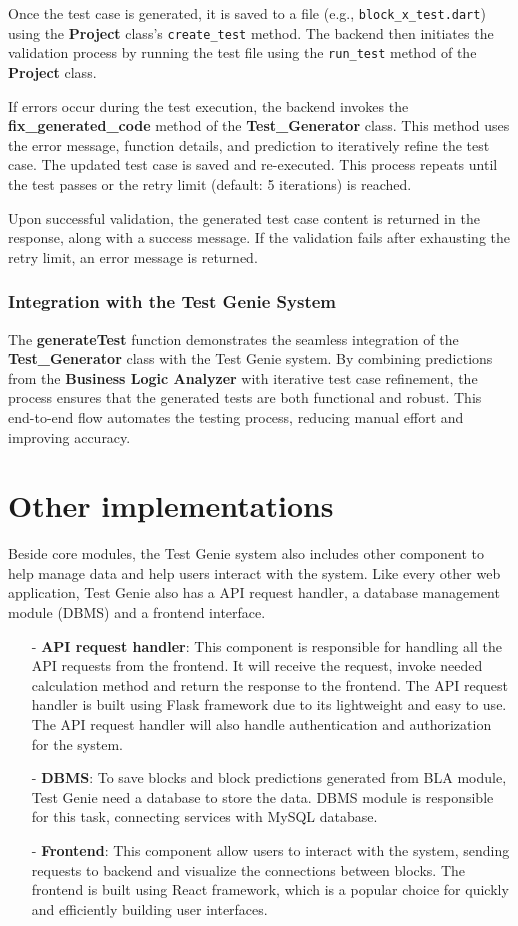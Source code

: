 Once the test case is generated, it is saved to a file (e.g., \texttt{block\_x\_test.dart}) using the \textbf{Project} class's \texttt{create\_test} method. The backend then initiates the validation process by running the test file using the \texttt{run\_test} method of the \textbf{Project} class.

If errors occur during the test execution, the backend invokes the \textbf{fix\_generated\_code} method of the \textbf{Test\_Generator} class. This method uses the error message, function details, and prediction to iteratively refine the test case. The updated test case is saved and re-executed. This process repeats until the test passes or the retry limit (default: 5 iterations) is reached.

Upon successful validation, the generated test case content is returned in the response, along with a success message. If the validation fails after exhausting the retry limit, an error message is returned.

\subsubsection{Integration with the Test Genie System}

The \textbf{generateTest} function demonstrates the seamless integration of the \textbf{Test\_Generator} class with the Test Genie system. By combining predictions from the \textbf{Business Logic Analyzer} with iterative test case refinement, the process ensures that the generated tests are both functional and robust. This end-to-end flow automates the testing process, reducing manual effort and improving accuracy.

\section{Other implementations}
Beside core modules, the Test Genie system also includes other component to help manage data and help users interact with the system. Like every other web application, Test Genie also has a API request handler, a database management module (DBMS) and a frontend interface. 
\begin{itemize}
    \item [-] \textbf{API request handler}: This component is responsible for handling all the API requests from the frontend. It will receive the request, invoke needed calculation method and return the response to the frontend. The API request handler is built using Flask framework due to its lightweight and easy to use. The API request handler will also handle authentication and authorization for the system.
    \item [-] \textbf{DBMS}: To save blocks and block predictions generated from BLA module, Test Genie need a database to store the data. DBMS module is responsible for this task, connecting services with MySQL database.
    \item [-] \textbf{Frontend}: This component allow users to interact with the system, sending requests to backend and visualize the connections between blocks. The frontend is built using React framework, which is a popular choice for quickly and efficiently building user interfaces.
\end{itemize}
